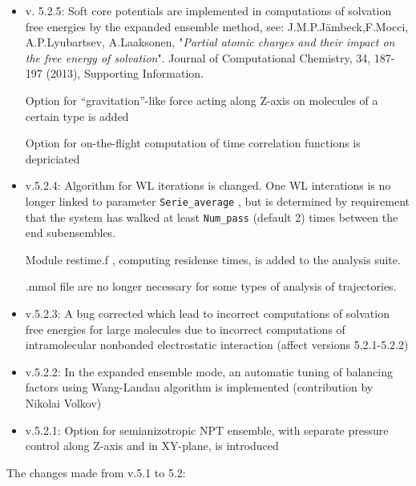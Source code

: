 \documentclass{article}
\begin{document}
\begin{itemize}
Special Lennard-Jones interactions between any atom pairs (different from the
parameters of .mmol file and what is determined by the combination rules) 
can be also introduced using ``pair list'' option of the input file. 

Option for on-the-flight computation of radial distribution functions
is depriciated

\item
v. 5.2.5:
Soft core potentials are implemented in computations of solvation free energies 
by the expanded ensemble method, see:
J.M.P.J{\"a}mbeck,F.Mocci, A.P.Lyubartsev, A.Laaksonen, 
"{\it Partial atomic charges and their impact on the free energy of solvation}". 
Journal of Computational Chemistry, 34, 187-197 (2013), Supporting Information.

Option for ``gravitation''-like force acting along Z-axis on molecules of a
certain type is added

Option for on-the-flight computation of time correlation functions
is depriciated

\item
v.5.2.4:
Algorithm for WL iterations is changed. One WL interations is no longer
linked to parameter \verb|Serie_average| , but is determined by requirement 
that the system has walked at least \verb|Num_pass| (default 2) times 
between the end subensembles.

Module restime.f , computing residense times, is added to the analysis suite.

.mmol file are no longer necessary for some types of analysis of trajectories.

\item
v.5.2.3:
A bug corrected which lead to incorrect computations of solvation 
free energies for large molecules due to incorrect computations 
of intramolecular nonbonded electrostatic interaction 
(affect versions 5.2.1-5.2.2)

\item
v.5.2.2: 
In the expanded ensemble mode, an automatic tuning of balancing factors
using Wang-Landau algorithm is implemented
(contribution by Nikolai Volkov)

\item
v.5.2.1: Option for semianizotropic NPT ensemble, with separate pressure 
control along Z-axis and in XY-plane, is introduced


\end{itemize}


The changes made from v.5.1 to 5.2:
\end{document}
